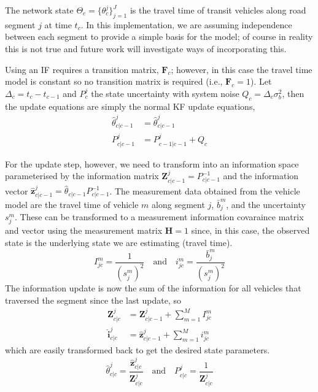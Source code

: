 The network state $\Theta_c = \{\theta_c^j\}_{j = 1}^J$ is the travel time 
of transit vehicles along road segment $j$ at time $t_c$.
In this implementation, we are assuming independence between each segment
to provide a simple basis for the model; of course in reality this
is not true and future work will investigate ways of incorporating this.

Using an IF requires a transition matrix, $\mathbf{F}_c$;
however, in this case the travel time model is constant so no
transition matrix is required (i.e., $\mathbf{F}_c = 1$).
Let $\Delta_c = t_c - t_{c-1}$ and $P_c^j$ the state uncertainty
with system noise $Q_c = \Delta_c \sigma_b^2$, then the update equations are
simply the normal KF update equations,
\begin{align}
\label{eq:kf_transition}
\hat\theta^j_{c|c-1} &= \hat\theta^j_{c|c-1} \\
P^j_{c|c-1} &= P^j_{c-1|c-1} + Q_c
\end{align}

For the update step, however, we need to transform into an information
space parameterised by the information matrix 
$\mathbf{Z}^j_{c|c-1} = P_{c|c-1}^{-1}$ 
and the information vector $\mathbf{\hat z}^j_{c|c-1} = \hat\theta_{c|c-1} P_{c|c-1}^{-1}$.
The measurement data obtained from the vehicle model are
the travel time of vehicle $m$ along segment $j$,
$\bar b^m_j$, and the uncertainty $s^m_j$.
These can be transformed to a measurement information covaraince matrix
and vector using the measurement matrix $\mathbf{H} = 1$ since,
in this case, the observed state is the underlying state we are estimating (travel time).
\begin{equation}
I^m_{jc} = \frac{1}{(s^m_j)^{2}}\quad\text{and}\quad
i^m_{jc} = \frac{\bar b^m_j}{(s^m_j)^2}
\end{equation}
The information update is now the sum of the information for all vehicles
that traversed the segment since the last update, so
\begin{align*}
\mathbf{Z}^j_{c|c} &= \mathbf{Z}^j_{c|c-1} + \sum_{m=1}^M I^m_{jc} \\
\mathbf{\hat i}^j_{c|c} &= \mathbf{\hat z}^j_{c|c-1} + \sum_{m=1}^M i^m_{jc}
\end{align*}
which are easily transformed back to get the desired state parameters.
\begin{equation}
\hat\theta^j_{c|c} = \frac{\mathbf{\hat z}^j_{c|c}}{\mathbf{Z}^j_{c|c}} 
\quad\text{and}\quad
P^j_{c|c} = \frac{1}{\mathbf{Z}^j_{c|c}}
\end{equation}



